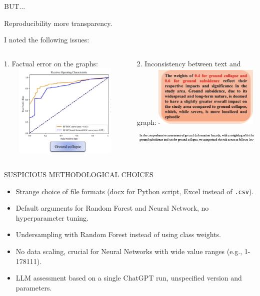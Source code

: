 \documentclass[11pt, aspectratio=169]{beamer}
\begin{document}
\begin{frame}{\MakeUppercase{But...}}

Reproducibility \textrightarrow more transparency.

I noted the following issues:

\begin{columns}[c]
    \begin{column}{.5\textwidth}
        1. Factual error on the graphs:
        \includegraphics[width=7cm,height=4.5cm]{images/wrong_roc}
    \end{column}
    \begin{column}{.5\textwidth}
        2. Inconsistency between text and graph:
\includegraphics[width=5cm,height=3cm]{images/weights} \\
\includegraphics[width=7cm,height=1cm]{images/wrong_weights}
    \end{column}
\end{columns}

\end{frame}


\begin{frame}{\MakeUppercase{Suspicious methodological choices}}

    \begin{itemize}
        \item Strange choice of file formats (docx for Python script, Excel instead of \texttt{.csv}).
        \item Default arguments for Random Forest and Neural Network, no hyperparameter tuning.
        \item Undersampling with Random Forest instead of using class weights.
        \item No data scaling, crucial for Neural Networks with wide value ranges (e.g., 1-178111).
        \item LLM assessment based on a single ChatGPT run, unspecified version and parameters.
    \end{itemize}

\end{frame}
\end{document}
